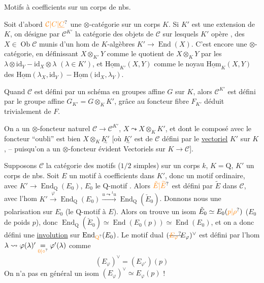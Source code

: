 Motifs à coefficients sur un corps de nbs.

Soit d'abord $\unsure{\mathcal C|C|\underline C}$ une $\otimes$-catégorie sur un corps $K$. Si $K'$ est
une extension  de $K$, on désigne par $\mathcal C^{K'}$ la catégorie des
objets de $\mathcal C$ sur lesquels $K'$ opère , 
des $X\in\operatorname{Ob}\mathcal C$ munis d'un hom de $K$-algèbres
$K'\longrightarrow\operatorname{End}(X)$. C'est encore une $\otimes$-catégorie, en définissant
$X\otimes_{K'}Y$ comme le quotient de $X\otimes_KY$ par les
$\lambda\otimes\mathrm{id}_Y-\mathrm{id}_X\otimes\lambda$ $(\lambda\in K')$, et $\underline{\mathrm{Hom}}_{K'}(X,Y)$ comme le
noyau  $\underline{\mathrm{Hom}}_K(X,Y)$ des $\underline{\mathrm{Hom}}(\lambda_X,\mathrm{id}_Y)-\underline{\mathrm{Hom}}(\mathrm{id}_X,\lambda_Y)$.

Quand $\mathcal C$ est défini par un schéma en groupes
affine $G$ sur $K$, alors $\mathcal C^{K'}$ est défini par
le groupe affine $G_{K'}=G\otimes_K K'$, grâce au foncteur
fibre  $F_{K'}$ déduit trivialement de $F$.

On a un $\otimes$-foncteur naturel $\mathcal C\longrightarrow\mathcal C^{K'}$, 
$X\leadsto X\otimes_K K'$, et dont le composé avec le foncteur
``oubli'' est bien $X\otimes_K\underset{\sim}{K'}$ [où $\underset{\sim}{K'}$ est  
de $\mathcal C$ défini par le \uline{vectoriel} $K'$ sur $K$, -- puisqu'on
a un $\otimes$-foncteur évident Vectoriels  sur $K\longrightarrow\mathcal C$].

Supposons $\mathcal C$ la catégorie des motifs ($1/2$ simples) sur un
corps $k$,  $K=\mathrm Q$, $K'$ un corps de nbs.
Soit $E$ un motif à coefficients dans $K'$, donc
un motif ordinaire, avec $K'\longrightarrow\operatorname{End}_{\mathrm Q}(E_0)$, $E_0$ le $\mathrm Q$-motif .
Alors $\unsure{\check E|\widetilde E}$  est défini par $\widetilde E$ dans $\mathcal C$, avec l'hom
 $K'\xrightarrow{\varphi}\operatorname{End}_{\mathrm Q}(E_0)\xrightarrow{u\leadsto{}^tu}\operatorname{End}_{\mathrm Q}(\check E_0)$. Donnons
nous une polarisation sur $E_0$ (le $\mathrm Q$-motif  à $E$).
Alors on trouve un isom $\check E_0\simeq E_0(\unsure{p|\rho})$
($E_0$ de poids $p$), donc 
$\operatorname{End}_{\mathrm Q}(\check E_0)\simeq\operatorname{End}(E_0(p))\simeq\operatorname{End}(E_0)$, et on a donc défini
une \uline{involution}  sur $\operatorname{End}_{\unsure{\mathrm Q}}(E_0)$. Le motif dual $(\deleted{\unsure{E_\varphi}}\!E_\varphi)^\vee$
 est défini par l'hom $\lambda\leadsto\varphi(\lambda)'\underset{\unsure{0|\circ}}{=}\varphi'(\lambda)$ comme
\[
\boxed{(E_\varphi)^\vee=(E_{\varphi'})(p)}
\]
On n'a pas en général un isom $(E_\varphi)^\vee\simeq E_\varphi(p)$ !

